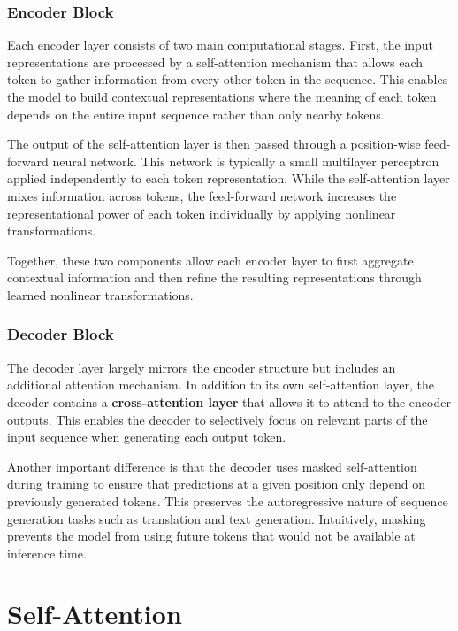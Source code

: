 \documentclass[11pt]{article}
\begin{document}
\subsubsection{Encoder Block}

Each encoder layer consists of two main computational stages. First, the input representations are processed by a self-attention mechanism that allows each token to gather information from every other token in the sequence. This enables the model to build contextual representations where the meaning of each token depends on the entire input sequence rather than only nearby tokens.

The output of the self-attention layer is then passed through a position-wise feed-forward neural network. This network is typically a small multilayer perceptron applied independently to each token representation. While the self-attention layer mixes information across tokens, the feed-forward network increases the representational power of each token individually by applying nonlinear transformations.

Together, these two components allow each encoder layer to first aggregate contextual information and then refine the resulting representations through learned nonlinear transformations.

\subsubsection{Decoder Block}

The decoder layer largely mirrors the encoder structure but includes an additional attention mechanism. In addition to its own self-attention layer, the decoder contains a \textbf{cross-attention layer} that allows it to attend to the encoder outputs. This enables the decoder to selectively focus on relevant parts of the input sequence when generating each output token.

Another important difference is that the decoder uses masked self-attention during training to ensure that predictions at a given position only depend on previously generated tokens. This preserves the autoregressive nature of sequence generation tasks such as translation and text generation. Intuitively, masking prevents the model from using future tokens that would not be available at inference time.

\section{Self-Attention}
\end{document}
